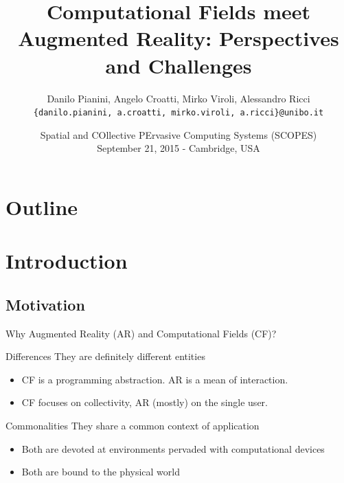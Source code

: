 \documentclass[presentation]{beamer} %
\title[Computational Fields and Augmented Reality]{Computational Fields meet Augmented Reality: Perspectives and Challenges}
\author[Pianini et. al]{
Danilo Pianini, Angelo Croatti, Mirko Viroli, Alessandro Ricci\\
\texttt{{\footnotesize \{danilo.pianini, a.croatti, mirko.viroli, a.ricci\}@unibo.it}}}
\institute[UniBo]
{\textsc{Alma Mater Studiorum}---Universit\`a di Bologna a Cesena}
\date[2015-09-21 SCOPES]{Spatial and COllective PErvasive Computing Systems (SCOPES)\\
\scriptsize September 21, 2015 - Cambridge, USA
}
\begin{document}
\frame[label=coverpage]{\titlepage}

\section*{Outline}
\frame{\tableofcontents}

\section{Introduction}

\subsection{Motivation}
\begin{frame}{Why Augmented Reality (AR) and Computational Fields (CF)?}
  \begin{block}{Differences}
    They are definitely different entities
    \begin{itemize}
      \item CF is a programming abstraction. AR is a mean of interaction.
      \item CF focuses on collectivity, AR (mostly) on the single user.
    \end{itemize}
  \end{block}
  \begin{block}{Commonalities}
    They share a common context of application
    \begin{itemize}
      \item Both are devoted at environments pervaded with computational devices
      \item Both are bound to the physical world
    \end{itemize}
  \end{block}
\end{frame}


\end{document}
